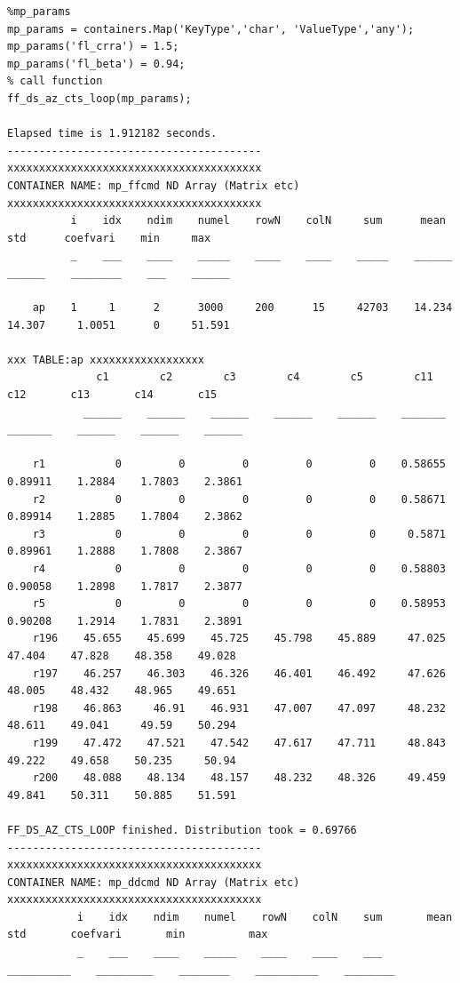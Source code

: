 \documentclass[
]{book}
\begin{document}
\begin{verbatim}
%mp_params
mp_params = containers.Map('KeyType','char', 'ValueType','any');
mp_params('fl_crra') = 1.5;
mp_params('fl_beta') = 0.94;
% call function
ff_ds_az_cts_loop(mp_params);

Elapsed time is 1.912182 seconds.
----------------------------------------
xxxxxxxxxxxxxxxxxxxxxxxxxxxxxxxxxxxxxxxx
CONTAINER NAME: mp_ffcmd ND Array (Matrix etc)
xxxxxxxxxxxxxxxxxxxxxxxxxxxxxxxxxxxxxxxx
          i    idx    ndim    numel    rowN    colN     sum      mean      std      coefvari    min     max  
          _    ___    ____    _____    ____    ____    _____    ______    ______    ________    ___    ______

    ap    1     1      2      3000     200      15     42703    14.234    14.307     1.0051      0     51.591

xxx TABLE:ap xxxxxxxxxxxxxxxxxx
              c1        c2        c3        c4        c5        c11        c12       c13       c14       c15  
            ______    ______    ______    ______    ______    _______    _______    ______    ______    ______

    r1           0         0         0         0         0    0.58655    0.89911    1.2884    1.7803    2.3861
    r2           0         0         0         0         0    0.58671    0.89914    1.2885    1.7804    2.3862
    r3           0         0         0         0         0     0.5871    0.89961    1.2888    1.7808    2.3867
    r4           0         0         0         0         0    0.58803    0.90058    1.2898    1.7817    2.3877
    r5           0         0         0         0         0    0.58953    0.90208    1.2914    1.7831    2.3891
    r196    45.655    45.699    45.725    45.798    45.889     47.025     47.404    47.828    48.358    49.028
    r197    46.257    46.303    46.326    46.401    46.492     47.626     48.005    48.432    48.965    49.651
    r198    46.863     46.91    46.931    47.007    47.097     48.232     48.611    49.041     49.59    50.294
    r199    47.472    47.521    47.542    47.617    47.711     48.843     49.222    49.658    50.235     50.94
    r200    48.088    48.134    48.157    48.232    48.326     49.459     49.841    50.311    50.885    51.591

FF_DS_AZ_CTS_LOOP finished. Distribution took = 0.69766
----------------------------------------
xxxxxxxxxxxxxxxxxxxxxxxxxxxxxxxxxxxxxxxx
CONTAINER NAME: mp_ddcmd ND Array (Matrix etc)
xxxxxxxxxxxxxxxxxxxxxxxxxxxxxxxxxxxxxxxx
           i    idx    ndim    numel    rowN    colN    sum       mean          std       coefvari       min          max   
           _    ___    ____    _____    ____    ____    ___    __________    _________    ________    __________    ________


\end{verbatim}
\end{document}
